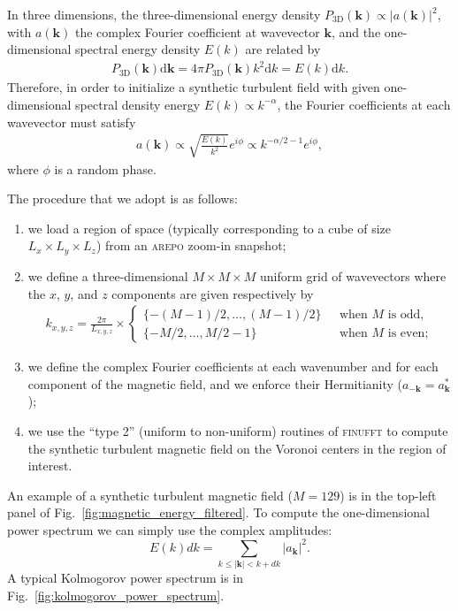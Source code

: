 \documentclass[]{article}
\begin{document}
In three dimensions, the three-dimensional energy density $P_{\text{3D}} (\bm k) \propto |a(\bm k)|^2$, with $a(\bm k)$ the complex Fourier coefficient at wavevector $\bm k$, and the one-dimensional spectral energy density $E(k)$ are related by
%
\begin{align}
	P_{\text{3D}} (\bm k) \mathrm{d} \bm k = 4 \pi P_{\text{3D}} (\bm k) k^2 \mathrm{d} k = E(k) \mathrm{d} k .
\end{align}
%
Therefore, in order to initialize a synthetic turbulent field with given one-dimensional spectral density energy $E(k) \propto k^{-\alpha}$, the Fourier coefficients at each wavevector must satisfy
%
\begin{align}\label{eq:power_law_fourier_coeff}
	a(\bm k) \propto \sqrt{\frac{E(k)}{k^2}} e^{i\phi}  \propto k^{-\alpha /2 - 1} e^{i\phi},
\end{align}
%
where $\phi$ is a random phase.

The procedure that we adopt is as follows:
%
\begin{enumerate}
	\item we load a region of space (typically corresponding to a cube of size $L_x \times L_y \times L_z$) from an \textsc{arepo} zoom-in snapshot;
	\item we define a three-dimensional $M \times M \times M$ uniform grid of wavevectors where the $x$, $y$, and $z$ components are given respectively by 
	\begin{align}
		k_{x,y,z} = \frac{2 \pi}{L_{x,y,z}} \times 
		\begin{cases}
			\lbrace -(M-1)/2, \ldots , (M-1)/2 \rbrace ~~~ &\text{when $M$ is odd}, \\
			\lbrace -M/2, \ldots , M/2 - 1 \rbrace ~~~ &\text{when $M$ is even};
		\end{cases}
	\end{align} 
	\item we define the complex Fourier coefficients at each wavenumber and for each component of the magnetic field, and we enforce their Hermitianity ($a_{-\bm k} = a_{\bm k}^*$);
	\item we use the ``type 2'' (uniform to non-uniform) routines of \textsc{finufft} to compute the synthetic turbulent magnetic field on the Voronoi centers in the region of interest.
\end{enumerate}
%
An example of a synthetic turbulent magnetic field ($M=129$) is in the top-left panel of Fig.~\ref{fig:magnetic_energy_filtered}.
%
To compute the one-dimensional power spectrum we can simply use the complex amplitudes:
%
\begin{equation}
	E(k) dk = \sum_{k \leq \lvert \bm k \rvert < k + dk} \lvert a_{\bm k} \rvert^2 .
\end{equation}
%
A typical Kolmogorov power spectrum is in Fig.~\ref{fig:kolmogorov_power_spectrum}.
\end{document}
